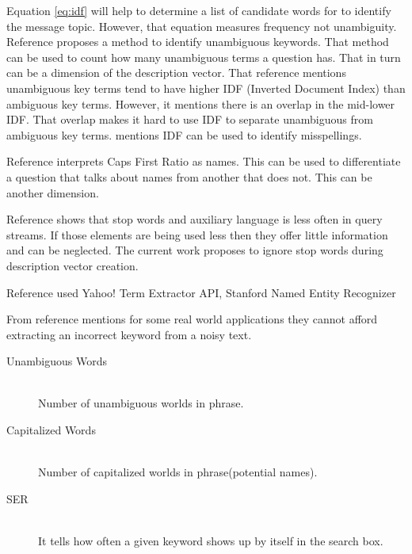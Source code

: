 \documentclass[twoside]{article}
\begin{document}
\begin{multicols}{2}
Equation \ref{eq:idf} will help to determine a list of candidate words for to identify the message topic. However, that equation measures frequency not unambiguity. Reference \cite{saif.ea:2012} proposes a method to identify unambiguous keywords. That method can be used to count how many unambiguous terms a question has. That in turn can be a dimension of the description vector. That reference mentions unambiguous key terms tend to have higher IDF (Inverted Document Index) than ambiguous key terms. However, it mentions there is an overlap in the mid-lower IDF. That overlap makes it hard to use IDF to separate unambiguous from ambiguous key terms. \cite{saif.ea:2012} mentions IDF can be used to identify misspellings.

Reference \cite{saif.ea:2012} interprets Caps First Ratio as names. This can be used to differentiate a question that talks about names from another that does not. This can be another dimension.

Reference \cite{saif.ea:2012} shows that stop words and auxiliary language is less often in query streams. If those elements are being used less then they offer little information and can be neglected. The current work proposes to ignore stop words during description vector creation.

Reference \cite{saif.ea:2012} used Yahoo! Term Extractor API, Stanford Named Entity Recognizer

From reference \cite{saif.ea:2012} mentions for some real world applications they cannot afford extracting an incorrect keyword from a noisy text.


\begin{description}
\item[Unambiguous Words] \hfill \\
Number of unambiguous worlds in phrase.  
\item[Capitalized Words] \hfill \\
Number of capitalized worlds in phrase(potential names). 
\item[SER] \hfill \\
It tells how often a given keyword shows up by itself in the search box.
\label{table:lst_dimensions} %
\end{description}





\end{multicols}
\end{document}
